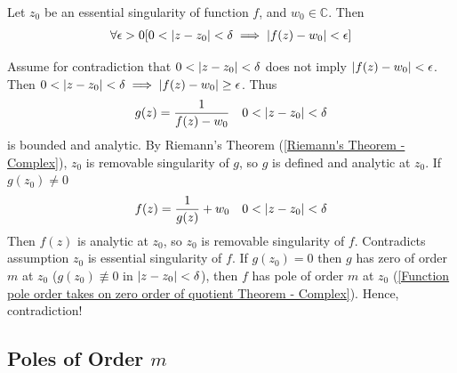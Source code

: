 \documentclass[12pt, english]{book}
\makeatletter
\renewenvironment{proof}[1][\proofname]{\par
	\pushQED{\qed}%
	\normalfont \topsep6\p@\@plus6\p@\relax
	\list{}{%
		\settowidth{\leftmargin}{\itshape\proofname:\hskip\labelsep}%
		\setlength{\labelwidth}{0pt}%
		\setlength{\itemindent}{-\leftmargin}%
		}%
	\item[\hskip\labelsep\itshape#1\@addpunct{:}]\ignorespaces
	}{\popQED\endlist\@endpefalse}
\makeatother
\begin{document}
	\begin{theorem}
		\label{Casorati-Weierstrass Theorem - Complex}
		Let \(z_0\) be an essential singularity of function \(f\), and \(w_0 \in \mathbb{C}\). Then 
		\begin{align*}
			\forall \epsilon > 0 [0<\abs{z-z_0}<\delta \implies \abs{f(z) - w_0}< \epsilon]
		\end{align*}
	\end{theorem}
	\begin{proof}
		Assume for contradiction that \(0<\abs{z-z_0}<\delta \) does not imply \(\abs{f(z) - w_0}< \epsilon\). Then \(0<\abs{z-z_0}<\delta \implies \abs{f(z) - w_0} \geq \epsilon\). Thus
		\begin{align*}
			g(z) &= \frac{1}{f(z) - w_0} & 0<\abs{z-z_0} < \delta
		\end{align*}
		is bounded and analytic. By Riemann's Theorem (\cref{Riemann's Theorem - Complex}), \(z_0\) is removable singularity of \(g\), so \(g\) is defined and analytic at \(z_0\). If \(g(z_0) \neq 0\)
		\begin{align*}
			f(z) &= \frac{1}{g(z)} + w_0 & 0 < \abs{z - z_0} < \delta
		\end{align*} 
		Then \(f(z)\) is analytic at \(z_0\), so \(z_0\) is removable singularity of \(f\). Contradicts assumption \(z_0\) is essential singularity of \(f\).
	\end{proof}
	If \(g(z_0) = 0\) then \(g\) has zero of order \(m\) at \(z_0\) (\(g(z_0) \nequiv 0 \) in \( \abs{z-z_0} < \delta\)), then \(f\) has pole of order \(m\) at \(z_0\) (\cref{Function pole order takes on zero order of quotient Theorem - Complex}). Hence, contradiction!
	
	\subsection{Poles of Order \texorpdfstring{\(m\)}{TEXT}}
	
\end{document}
